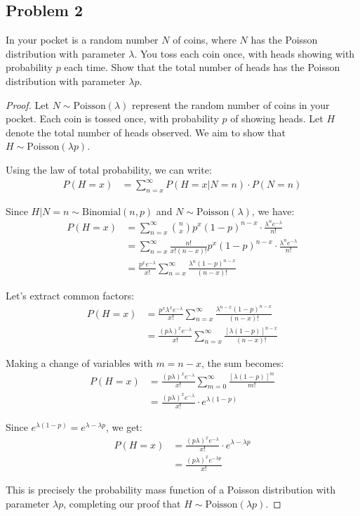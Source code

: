 \documentclass[letterpaper, 11pt]{article}
\newcommand{\1}{\mathds{1}}	%
\theoremstyle{definition}
\begin{document}
\subsection*{Problem 2}
In your pocket is a random number $N$ of coins, where $N$ has the Poisson distribution with parameter $\lambda.$ You toss each coin once, with heads showing with probability $p$ each time. Show that the total number of heads has the Poisson distribution with parameter $\lambda p.$
\begin{proof}
    
Let $N \sim \text{Poisson}(\lambda)$ represent the random number of coins in your pocket. Each coin is tossed once, with probability $p$ of showing heads. Let $H$ denote the total number of heads observed. We aim to show that $H \sim \text{Poisson}(\lambda p)$.

Using the law of total probability, we can write:
\begin{align*}
P(H = x) &= \sum_{n=x}^{\infty} P(H = x | N = n) \cdot P(N = n)
\end{align*}

Since $H|N=n \sim \text{Binomial}(n,p)$ and $N \sim \text{Poisson}(\lambda)$, we have:
\begin{align*}
P(H = x) &= \sum_{n=x}^{\infty} \binom{n}{x} p^x (1-p)^{n-x} \cdot \frac{\lambda^n e^{-\lambda}}{n!} \\
&= \sum_{n=x}^{\infty} \frac{n!}{x!(n-x)!} p^x (1-p)^{n-x} \cdot \frac{\lambda^n e^{-\lambda}}{n!} \\
&= \frac{p^x e^{-\lambda}}{x!} \sum_{n=x}^{\infty} \frac{\lambda^n(1-p)^{n-x}}{(n-x)!}
\end{align*}

Let's extract common factors:
\begin{align*}
P(H = x) &= \frac{p^x \lambda^x e^{-\lambda}}{x!} \sum_{n=x}^{\infty} \frac{\lambda^{n-x}(1-p)^{n-x}}{(n-x)!} \\
&= \frac{(p\lambda)^x e^{-\lambda}}{x!} \sum_{n=x}^{\infty} \frac{[\lambda(1-p)]^{n-x}}{(n-x)!}
\end{align*}

Making a change of variables with $m = n-x$, the sum becomes:
\begin{align*}
P(H = x) &= \frac{(p\lambda)^x e^{-\lambda}}{x!} \sum_{m=0}^{\infty} \frac{[\lambda(1-p)]^{m}}{m!} \\
&= \frac{(p\lambda)^x e^{-\lambda}}{x!} \cdot e^{\lambda(1-p)}
\end{align*}

Since $e^{\lambda(1-p)} = e^{\lambda-\lambda p}$, we get:
\begin{align*}
P(H = x) &= \frac{(p\lambda)^x e^{-\lambda}}{x!} \cdot e^{\lambda-\lambda p} \\
&= \frac{(p\lambda)^x e^{-\lambda p}}{x!}
\end{align*}

This is precisely the probability mass function of a Poisson distribution with parameter $\lambda p$, completing our proof that $H \sim \text{Poisson}(\lambda p)$.
\end{proof}
\end{document}
